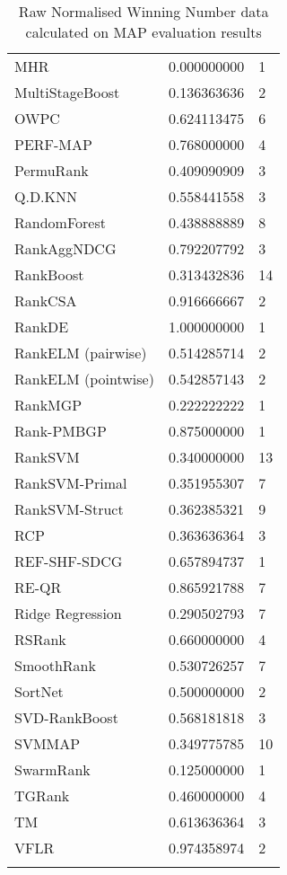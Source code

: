 \begin{longtable}{l|l|l}
MHR & 0.000000000 & 1 \\ 
MultiStageBoost & 0.136363636 & 2 \\ 
OWPC & 0.624113475 & 6 \\ 
PERF-\acs{MAP} & 0.768000000 & 4 \\ 
PermuRank & 0.409090909 & 3 \\ 
Q.D.\acs{KNN} & 0.558441558 & 3 \\ 
RandomForest & 0.438888889 & 8 \\ 
RankAgg\acs{NDCG} & 0.792207792 & 3 \\ 
RankBoost & 0.313432836 & 14 \\ 
RankCSA & 0.916666667 & 2 \\ 
RankDE & 1.000000000 & 1 \\ 
RankELM (pairwise) & 0.514285714 & 2 \\ 
RankELM (pointwise) & 0.542857143 & 2 \\ 
RankMGP & 0.222222222 & 1 \\ 
Rank-PMBGP & 0.875000000 & 1 \\ 
Rank\acs{SVM} & 0.340000000 & 13 \\ 
Rank\acs{SVM}-Primal & 0.351955307 & 7 \\ 
Rank\acs{SVM}-Struct & 0.362385321 & 9 \\ 
RCP & 0.363636364 & 3 \\ 
REF-SHF-SDCG & 0.657894737 & 1 \\ 
RE-QR & 0.865921788 & 7 \\ 
Ridge Regression & 0.290502793 & 7 \\ 
RSRank & 0.660000000 & 4 \\ 
SmoothRank & 0.530726257 & 7 \\ 
SortNet & 0.500000000 & 2 \\ 
\acs{SVD}-RankBoost & 0.568181818 & 3 \\ 
\acs{SVM}\acs{MAP} & 0.349775785 & 10 \\ 
SwarmRank & 0.125000000 & 1 \\ 
TGRank & 0.460000000 & 4 \\ 
TM & 0.613636364 & 3 \\ 
VFLR & 0.974358974 & 2 \\ 
\caption{Raw Normalised Winning Number data calculated on \acs{MAP} evaluation results}
\label{tab:raw_data_norm_winnum_map}
\end{longtable}